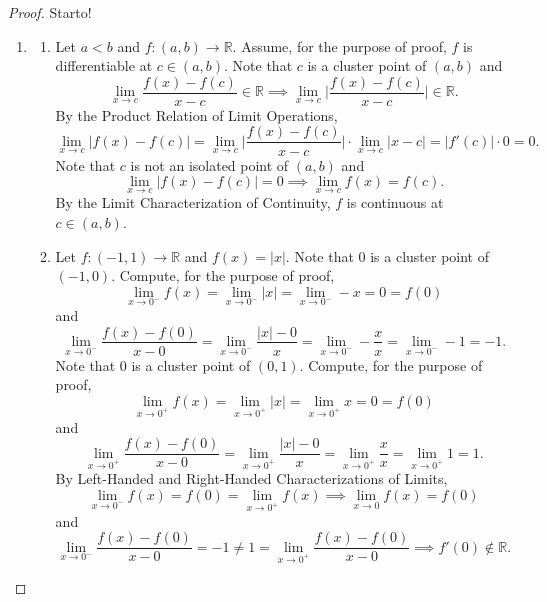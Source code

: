 \documentclass[12pt]{article}
\theoremstyle{definition}
\begin{document}
\begin{proof}
    Starto! 
    \begin{enumerate}[label=(\alph*)]
        \item \begin{enumerate}[label=(\roman*)]
            \item Let \(a < b\) and \(f : (a, b) \to \mathbb{R}\). Assume, for the purpose of proof, \(f\) is differentiable at \(c \in (a, b)\). Note that \(c\) is a cluster point of \((a, b)\) and 
            \[
                \lim_{x \to c} \frac{f(x) - f(c)}{x - c} \in \mathbb{R} \implies \lim_{x \to c} \bigg\vert \frac{f(x) - f(c)}{x - c} \bigg\vert \in \mathbb{R}.
            \]
            By the Product Relation of Limit Operations, 
            \[
                \lim_{x \to c} \vert f(x) - f(c) \vert = \lim_{x \to c} \bigg\vert \frac{f(x) - f(c)}{x - c} \bigg\vert \cdot \lim_{x \to c} \vert x - c \vert = \vert f'(c) \vert \cdot 0 = 0.
            \]
            Note that \(c\) is not an isolated point of \((a, b)\) and
            \[
                \lim_{x \to c} \vert f(x) - f(c) \vert = 0 \implies \lim_{x \to c} f(x) = f(c).
            \]
            By the Limit Characterization of Continuity, \(f\) is continuous at \(c \in (a, b)\).
            \item Let \(f : (-1, 1) \to \mathbb{R}\) and \(f(x) = \vert x \vert\). Note that \(0\) is a cluster point of \((-1, 0)\). Compute, for the purpose of proof,
            \[
                \lim_{x \to 0^{-}} f(x) = \lim_{x \to 0^{-}} \vert x \vert = \lim_{x \to 0^{-}} -x = 0 = f(0)
            \]
            and 
            \[
                \lim_{x \to 0^{-}} \frac{f(x) - f(0)}{x - 0} = \lim_{x \to 0^{-}} \frac{\vert x \vert - 0}{x} = \lim_{x \to 0^{-}} -\frac{x}{x} = \lim_{x \to 0^{-}} -1 = -1.
            \]
            Note that \(0\) is a cluster point of \((0, 1)\). Compute, for the purpose of proof,
            \[
                \lim_{x \to 0^{+}} f(x) = \lim_{x \to 0^{+}} \vert x \vert = \lim_{x \to 0^{+}} x = 0 = f(0)
            \]
            and
            \[
                \lim_{x \to 0^{+}} \frac{f(x) - f(0)}{x - 0} = \lim_{x \to 0^{+}}\frac{\vert x \vert - 0}{x} = \lim_{x \to 0^{+}} \frac{x}{x} = \lim_{x \to 0^{+}} 1 = 1.
            \]
            By Left-Handed and Right-Handed Characterizations of Limits,
            \[
                \lim_{x \to 0^{-}} f(x) = f(0) = \lim_{x \to 0^{+}} f(x) \implies \lim_{x \to 0} f(x) = f(0) 
            \]
            and 
            \[
                \lim_{x \to 0^{-}}\frac{f(x) - f(0)}{x - 0} = - 1 \neq 1 = \lim_{x \to 0^{+}} \frac{f(x) - f(0)}{x - 0} \implies f'(0) \notin \mathbb{R}. 
\]
\end{enumerate}
\end{enumerate}
\end{proof}
\end{document}
